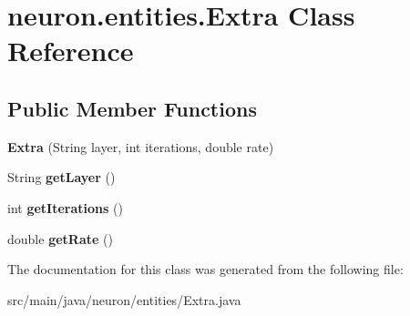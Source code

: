 \hypertarget{classneuron_1_1entities_1_1Extra}{}\section{neuron.\+entities.\+Extra Class Reference}
\label{classneuron_1_1entities_1_1Extra}
\subsection*{Public Member Functions}
\begin{DoxyCompactItemize}
\item 
\mbox{\label{classneuron_1_1entities_1_1Extra_ad4b22bfddf4c30f31fc3ad68b3c22466}} 
{\bfseries Extra} (String layer, int iterations, double rate)
\item 
\mbox{\label{classneuron_1_1entities_1_1Extra_a3a0fc2e608c2b04fbe64fa07b3531a72}} 
String {\bfseries get\+Layer} ()
\item 
\mbox{\label{classneuron_1_1entities_1_1Extra_add59c017b1cb9e80b582c3ad351f233e}} 
int {\bfseries get\+Iterations} ()
\item 
\mbox{\label{classneuron_1_1entities_1_1Extra_a69484f6fb8eb8c070418ec7f560abb64}} 
double {\bfseries get\+Rate} ()
\end{DoxyCompactItemize}


The documentation for this class was generated from the following file\+:\begin{DoxyCompactItemize}
\item 
src/main/java/neuron/entities/Extra.\+java\end{DoxyCompactItemize}
